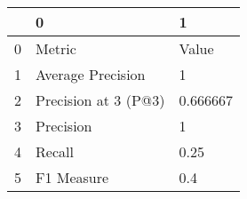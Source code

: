 \begin{tabular}{lll}
\toprule
{} &                     0 &         1 \\
\midrule
0 &                Metric &     Value \\
1 &     Average Precision &         1 \\
2 &  Precision at 3 (P@3) &  0.666667 \\
3 &             Precision &         1 \\
4 &                Recall &      0.25 \\
5 &            F1 Measure &       0.4 \\
\bottomrule
\end{tabular}
